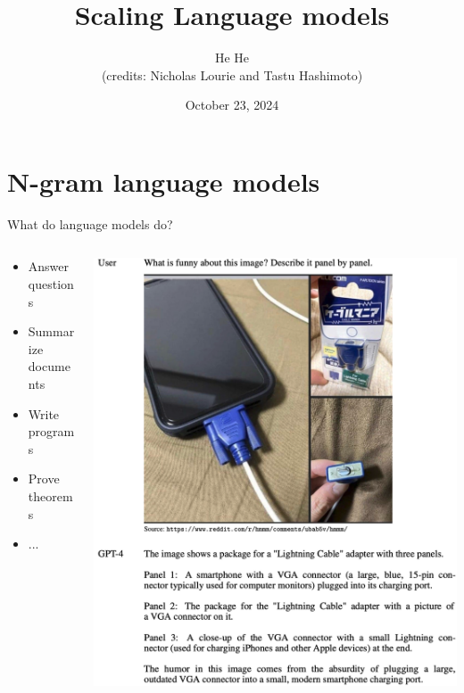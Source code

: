 \documentclass[usenames,dvipsnames,notes,11pt,aspectratio=169,hyperref={colorlinks=true, linkcolor=blue}]{beamer}
\title[DS-GA.1011]{Scaling Language models}
\author[He He]{He He\\
(credits: Nicholas Lourie and Tastu Hashimoto)
}
\institute[NYU]{
    \texttt{[image: ../figures/nyu-logo]}\\
}
\date{October 23, 2024}
\begin{document}
\begin{frame}
\titlepage
\end{frame}

\section{N-gram language models}

\begin{frame}
    {What do language models do?}

    \begin{columns}
        \begin{column}{0.5\textwidth}
            \begin{itemize}
                \item Answer questions 
                \item Summarize documents 
                \item Write programs 
                \item Prove theorems
                \item ...
            \end{itemize}
        \end{column}
        \begin{column}{0.5\textwidth}
            \includegraphics[width=\textwidth]{figures/gpt4}
        \end{column}
    \end{columns}
\end{frame}
\end{document}
